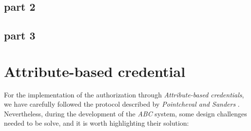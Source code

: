 \documentclass[10pt,conference,compsocconf]{IEEEtran}
\begin{document}
\subsection{part 2}
\subsection{part 3}
\section{Attribute-based credential}
For the implementation of the authorization through \textit{Attribute-based
credentials}, we have carefully followed the protocol described by
\textit{Pointcheval and Sanders} \cite{PS_signature}. Nevertheless, during the
development of the \textit{ABC} system, some design challenges needed to be
solve, and it is worth highlighting their solution:
\end{document}
